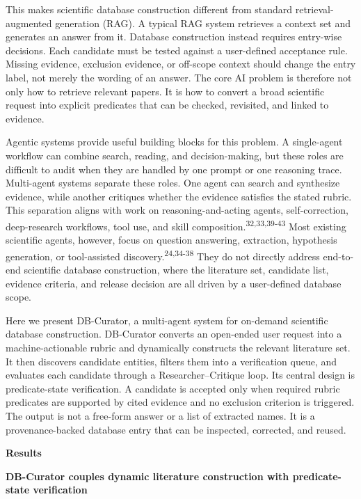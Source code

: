 \documentclass[
]{article}
\begin{document}
This makes scientific database construction different from standard
retrieval-augmented generation (RAG). A typical RAG system retrieves a
context set and generates an answer from it. Database construction
instead requires entry-wise decisions. Each candidate must be tested
against a user-defined acceptance rule. Missing evidence, exclusion
evidence, or off-scope context should change the entry label, not merely
the wording of an answer. The core AI problem is therefore not only how
to retrieve relevant papers. It is how to convert a broad scientific
request into explicit predicates that can be checked, revisited, and
linked to evidence.

Agentic systems provide useful building blocks for this problem. A
single-agent workflow can combine search, reading, and decision-making,
but these roles are difficult to audit when they are handled by one
prompt or one reasoning trace. Multi-agent systems separate these roles.
One agent can search and synthesize evidence, while another critiques
whether the evidence satisfies the stated rubric. This separation aligns
with work on reasoning-and-acting agents, self-correction,
deep-research workflows, tool use, and skill composition.\textsuperscript{32,33,39-43}
Most existing scientific agents, however, focus on question answering,
extraction, hypothesis generation, or tool-assisted discovery.\textsuperscript{24,34-38}
They do not directly address end-to-end scientific database construction,
where the literature set, candidate list, evidence criteria, and release
decision are all driven by a user-defined database scope.

Here we present DB-Curator, a multi-agent system for on-demand scientific
database construction. DB-Curator converts an open-ended user request
into a machine-actionable rubric and dynamically constructs the relevant
literature set. It then discovers candidate entities, filters them into
a verification queue, and evaluates each candidate through a
Researcher--Critique loop. Its central design is predicate-state
verification. A candidate is accepted only when required rubric
predicates are supported by cited evidence and no exclusion criterion is
triggered.
The output is not a free-form answer or a list of extracted names. It is
a provenance-backed database entry that can be inspected, corrected, and
reused.

\textbf{Results}

\textbf{DB-Curator couples dynamic literature construction with
predicate-state verification}
\end{document}
